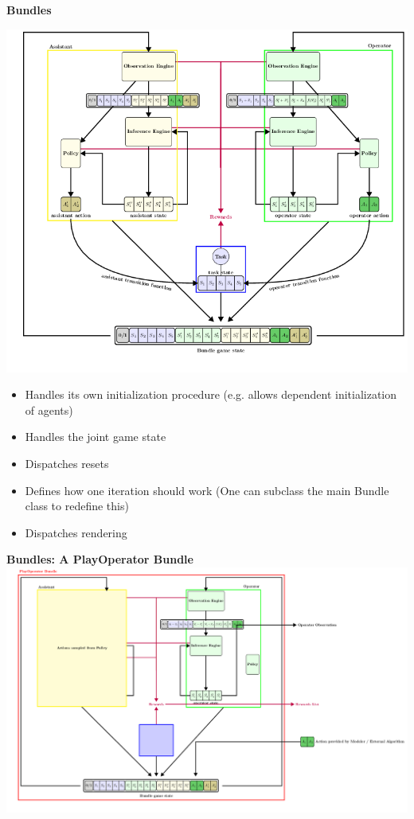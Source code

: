 \documentclass[11pt, xcolor = {dvipsnames}]{beamer}
\begin{document}
\begin{frame}{\textbf{Bundles}}

\begin{minipage}{.3\textwidth}
\includegraphics[width=\textwidth]{fig/bundle.png} 
\end{minipage}%
\begin{minipage}{.7\textwidth}
\begin{itemize}
\item Handles its own initialization procedure (e.g. allows dependent initialization of agents)
\item Handles the joint game state
\item Dispatches resets
\item Defines how one iteration should work (One can subclass the main Bundle class to redefine this)
\item Dispatches rendering
\end{itemize}
\end{minipage}
\end{frame}


\begin{frame}{\textbf{Bundles: A PlayOperator Bundle}}
\centering
\includegraphics[height=.9\textheight]{fig/PlayOperator.png} 
\end{frame}
\end{document}
